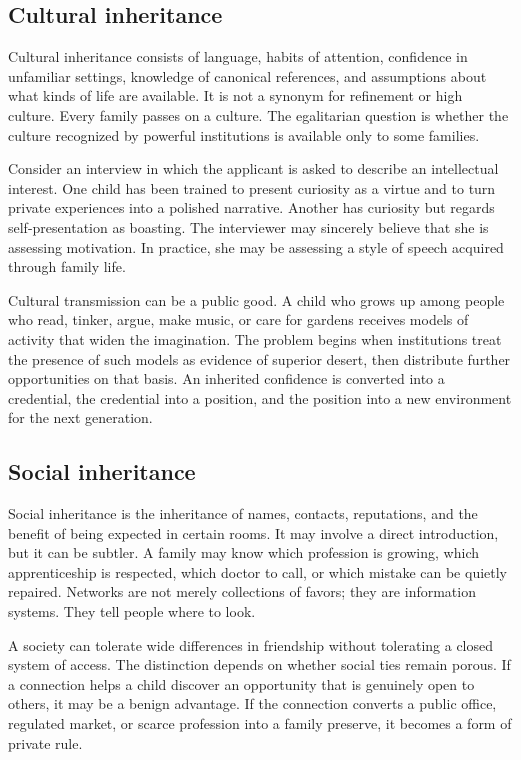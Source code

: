 ﻿\documentclass[12pt,a4paper]{book}
\begin{document}
\subsection{Cultural inheritance}

Cultural inheritance consists of language, habits of attention, confidence
in unfamiliar settings, knowledge of canonical references, and assumptions
about what kinds of life are available.  It is not a synonym for refinement
or high culture.  Every family passes on a culture.  The egalitarian
question is whether the culture recognized by powerful institutions is
available only to some families.

Consider an interview in which the applicant is asked to describe an
intellectual interest.  One child has been trained to present curiosity as
a virtue and to turn private experiences into a polished narrative.  Another
has curiosity but regards self-presentation as boasting.  The interviewer
may sincerely believe that she is assessing motivation.  In practice, she
may be assessing a style of speech acquired through family life.

Cultural transmission can be a public good.  A child who grows up among
people who read, tinker, argue, make music, or care for gardens receives
models of activity that widen the imagination.  The problem begins when
institutions treat the presence of such models as evidence of superior
desert, then distribute further opportunities on that basis.  An inherited
confidence is converted into a credential, the credential into a position,
and the position into a new environment for the next generation.

\subsection{Social inheritance}

Social inheritance is the inheritance of names, contacts, reputations, and
the benefit of being expected in certain rooms.  It may involve a direct
introduction, but it can be subtler.  A family may know which profession is
growing, which apprenticeship is respected, which doctor to call, or which
mistake can be quietly repaired.  Networks are not merely collections of
favors; they are information systems.  They tell people where to look.

A society can tolerate wide differences in friendship without tolerating a
closed system of access.  The distinction depends on whether social ties
remain porous.  If a connection helps a child discover an opportunity that
is genuinely open to others, it may be a benign advantage.  If the
connection converts a public office, regulated market, or scarce profession
into a family preserve, it becomes a form of private rule.
\end{document}

